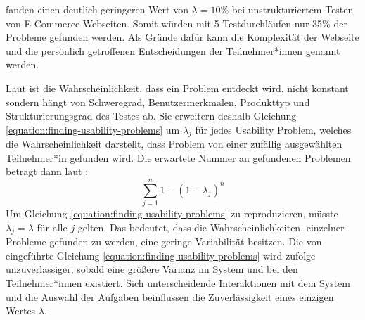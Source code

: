 \textcite{spoolTestingWeb2001} fanden einen deutlich geringeren Wert von $\lambda{}=10\%$ bei
unstrukturiertem Testen von E-Commerce-Webseiten. Somit würden mit 5 Testdurchläufen nur 35\% der
Probleme gefunden werden. Als Gründe dafür kann die Komplexität der Webseite und die persönlich
getroffenen Entscheidungen der Teilnehmer*innen genannt werden.
\parencite{spoolTestingWeb2001}

Laut \textcite{woolrychWhyWhen2001} ist die Wahrscheinlichkeit, dass ein Problem entdeckt wird,
nicht konstant sondern hängt von Schweregrad, Benutzermerkmalen, Produkttyp und Strukturierungsgrad
des Testes ab. Sie erweitern deshalb Gleichung \ref{equation:finding-usability-problems} um
$\lambda{}_j$ für jedes Usability Problem, welches die Wahrscheinlichkeit darstellt, dass Problem
von einer zufällig ausgewählten Teilnehmer*in gefunden wird. Die erwartete Nummer an gefundenen
Problemen beträgt dann laut \textcite{woolrychWhyWhen2001}:
\begin{equation}
  \sum_{j=1}^n 1-(1-\lambda{}_j)^n
\end{equation}
Um Gleichung \ref{equation:finding-usability-problems} zu reproduzieren, müsste $\lambda{}_j =
\lambda{}$ für alle $j$ gelten. Das bedeutet, dass die Wahrscheinlichkeiten, einzelner Probleme
gefunden zu werden, eine geringe Variabilität besitzen. Die von
\textcite{nielsenMathematicalModel1993} eingeführte Gleichung
\ref{equation:finding-usability-problems} wird \textcite{woolrychWhyWhen2001} zufolge
unzuverlässiger, sobald eine größere Varianz im System und bei den Teilnehmer*innen existiert. Sich
unterscheidende Interaktionen mit dem System und die Auswahl der Aufgaben beinflussen die
Zuverlässigkeit eines einzigen Wertes $\lambda{}$.
\parencite{woolrychWhyWhen2001}

